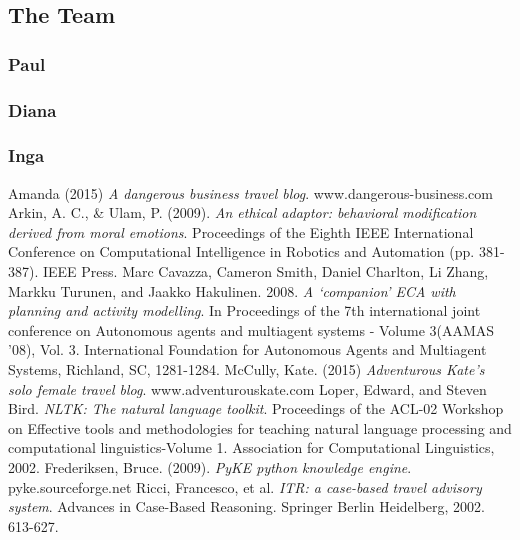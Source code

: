 \documentclass[11pt]{article} %
\begin{document}
\subsection{The Team}
\subsubsection{Paul}
\subsubsection{Diana}
\subsubsection{Inga}

\begin{thebibliography}{9}

Amanda (2015) \emph{A dangerous business travel blog}. www.dangerous-business.com
Arkin, A. C., \& Ulam, P. (2009). \emph{An ethical adaptor: behavioral modification derived from moral emotions}. Proceedings of the Eighth IEEE International Conference on Computational Intelligence in Robotics and Automation (pp. 381-387). IEEE Press.
Marc Cavazza, Cameron Smith, Daniel Charlton, Li Zhang, Markku Turunen, and Jaakko Hakulinen. 2008. \emph{A `companion' ECA with planning and activity modelling}. In Proceedings of the 7th international joint conference on Autonomous agents and multiagent systems - Volume 3(AAMAS '08), Vol. 3. International Foundation for Autonomous Agents and Multiagent Systems, Richland, SC, 1281-1284.
McCully, Kate. (2015) \emph{Adventurous Kate's solo female travel blog}. www.adventurouskate.com
Loper, Edward, and Steven Bird. \emph{NLTK: The natural language toolkit}. Proceedings of the ACL-02 Workshop on Effective tools and methodologies for teaching natural language processing and computational linguistics-Volume 1. Association for Computational Linguistics, 2002.
Frederiksen, Bruce. (2009). \emph{PyKE python knowledge engine}. pyke.sourceforge.net
Ricci, Francesco, et al. \emph{ITR: a case-based travel advisory system}. Advances in Case-Based Reasoning. Springer Berlin Heidelberg, 2002. 613-627.


\end{thebibliography}
\end{document}
